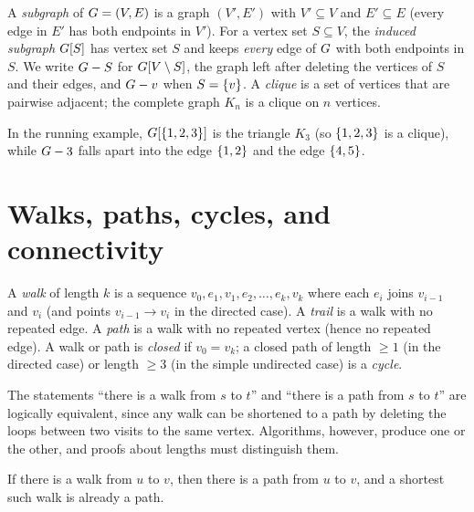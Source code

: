 \begin{definition}
\label{ch01:def-subgraph}
A \emph{subgraph} of $G=(V,E)$ is a graph $(V',E')$ with $V'\subseteq V$ and
$E'\subseteq E$ (every edge in $E'$ has both endpoints in $V'$). For a vertex set
$S\subseteq V$, the \emph{induced subgraph} $G[S]$ has vertex set $S$ and keeps
\emph{every} edge of $G$ with both endpoints in $S$. We write $G-S$ for
$G[V\setminus S]$, the graph left after deleting the vertices of $S$ and their
edges, and $G-v$ when $S=\{v\}$. A \emph{clique} is a set of vertices that are
pairwise adjacent; the complete graph $K_n$ is a clique on $n$ vertices.
\end{definition}

In the running example, $G[\{1,2,3\}]$ is the triangle $K_3$ (so $\{1,2,3\}$
is a clique), while $G-3$ falls apart into the edge $\{1,2\}$ and the edge
$\{4,5\}$.

\section{Walks, paths, cycles, and connectivity}
\label{ch01:paths}

\begin{definition}
\label{ch01:def-walk}
A \emph{walk} of length $k$ is a sequence $v_0, e_1, v_1, e_2, \dots, e_k, v_k$
where each $e_i$ joins $v_{i-1}$ and $v_i$ (and points $v_{i-1}\to v_i$ in the
directed case). A \emph{trail} is a walk with no repeated edge. A \emph{path} is
a walk with no repeated vertex (hence no repeated edge). A walk or path is
\emph{closed} if $v_0 = v_k$; a closed path of length $\ge 1$ (in the directed
case) or length $\ge 3$ (in the simple undirected case) is a \emph{cycle}.
\end{definition}

The statements ``there is a walk from $s$ to $t$'' and ``there is a path from $s$ to $t$'' are logically equivalent, since any walk can be shortened to a path by deleting the loops between two visits to the same vertex. Algorithms, however, produce one or the other, and proofs about lengths must distinguish them.

\begin{lemma}
\label{ch01:walk-to-path}
If there is a walk from $u$ to $v$, then there is a path from $u$ to $v$, and a
shortest such walk is already a path.
\end{lemma}

